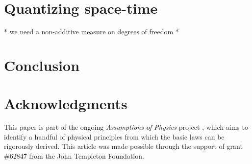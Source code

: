 \documentclass[10pt,twocolumn, nofootinbib]{revtex4-2}
\begin{document}
\section{Quantizing space-time}
* we need a non-additive measure on degrees of freedom
*

\section{Conclusion}



\section*{Acknowledgments}
This paper is part of the ongoing \textit{Assumptions of Physics} project \cite{aop-book}, which aims to identify a handful of physical principles from which the basic laws can be rigorously derived. This article was made possible through the support of grant \#62847 from the John Templeton Foundation.




\newcommand{\pj}[1] {\underbar{$#1$}}
\end{document}
